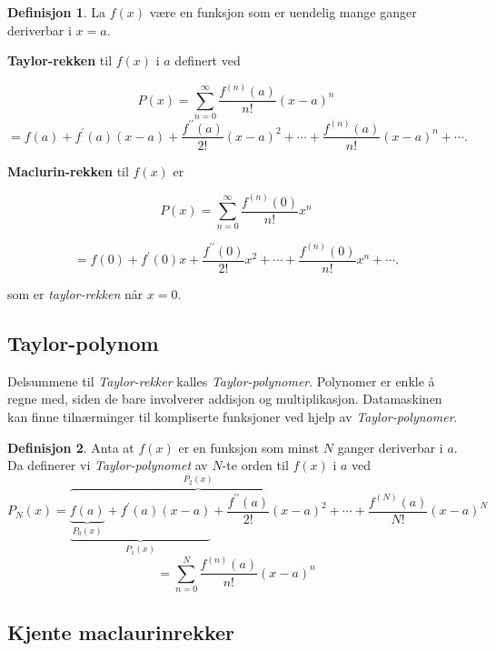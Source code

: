 \documentclass[11pt]{article}
\theoremstyle{definition}
\newtheorem{mindef}{Definisjon}[section]
\newenvironment{fmindef}
{\begin{mdframed}[style=minstil]\begin{mindef}}
		{\end{mindef}\end{mdframed}}
\theoremstyle{definition}
\theoremstyle{definition}
\theoremstyle{definition}
\theoremstyle{definition}
\theoremstyle{definition}
\begin{document}
		\begin{fmindef}
			La \(f(x)\) være en funksjon som er uendelig mange ganger deriverbar i \(x=a\). 
			
			\textbf{Taylor-rekken} til \(f(x)\) i \(a\) definert ved
			
			
			\[P(x)=\sum_{n=0}^{\infty}\dfrac{f^{(n)}(a)}{n!}(x-a)^n\]
			\[=f(a)+f^{\prime}(a)(x-a)+\dfrac{f^{\prime \prime}(a)}{2!}(x-a)^2+\cdots+\dfrac{f^{(n)}(a)}{n!}(x-a)^n+\cdots.\]
		
			\textbf{Maclurin-rekken	} til \(f(x)\) er
			
			\[P(x)=\sum_{n=0}^{\infty} \dfrac{f^{(n)}(0)}{n!}x^n \]
			
			\[=f(0)+f^{\prime}(0)x+\dfrac{f^{\prime \prime}(0)}{2!}x^2+\cdots+\dfrac{f^{(n)}(0)}{n!}x^n+\cdots.\]
			
			som er \textit{taylor-rekken} når \(x=0\).
		\end{fmindef}
		
		\subsection{Taylor-polynom}
		
		Delsummene til \textit{Taylor-rekker} kalles \textit{Taylor-polynomer}. Polynomer er enkle å regne med, siden de bare involverer addisjon og multiplikasjon. Datamaskinen kan finne tilnærminger til kompliserte funksjoner ved hjelp av \textit{Taylor-polynomer}. 
		
		
		\begin{fmindef}
			Anta at \(f(x)\) er en funksjon som minst \(N\) ganger deriverbar i \(a\). Da definerer vi \textit{Taylor-polynomet} av \(N\)-te orden til \(f(x)\) i \(a\) ved
			\[P_N(x)=\overbrace{\underbrace{\underbrace{f(a)}_{P_0(x)}+f^{\prime}(a)(x-a)}_{P_1(x)}+\dfrac{f^{\prime \prime}(a)}{2!}(x-a)^2}^{P_2(x)}
			+\cdots+\dfrac{f^{(N)}(a)}{N!}(x-a)^N
			\]
			\[=\sum_{n=0}^{N}\dfrac{f^{(n)}(a)}{n!}(x-a)^n \]
		\end{fmindef}
		
		\newpage
		
		\subsection{Kjente maclaurinrekker}
		
\end{document}
